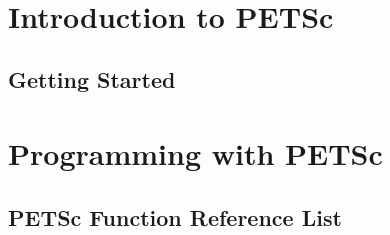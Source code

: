 \newpage

\hbox{ }

\vspace{2in}



\vspace{1in}



\setcounter{page}{3}
\tableofcontents
\clearpage
{}


\part{Introduction to PETSc}
\label{part:intro}
\chapter{Getting Started}


\part{Programming with PETSc}
\label{part:usage}




\appendix

\chapter{PETSc Function Reference List}



\vfill
\eject









